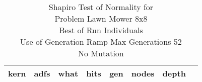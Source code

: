 \begin{table}[H]
\caption{Shapiro Test of Normality for \\ Problem  Lawn Mower 8x8\\Best of Run Individuals \\ Use of Generation Ramp  Max Generations 52\\ No Mutation \\}
\begin{center}
\scalebox{0.8} %
{
\begin{tabular}{lrrrrrrr}
\hline
kern & adfs & what & hits & gen & nodes & depth \\
\hline


\end{tabular}
}
\end{center}
\end{table}

